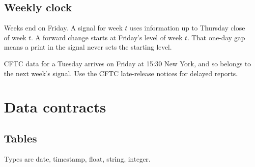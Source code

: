\documentclass[11pt]{article}
\newcommand{\code}[1]{\texttt{\detokenize{#1}}}
\begin{document}
\subsection{Weekly clock}
Weeks end on Friday. A signal for week $t$ uses information up to Thursday close of week $t$. A forward change starts at Friday's level of week $t$. That one-day gap means a print in the signal never sets the starting level.

CFTC data for a Tuesday arrives on Friday at 15:30 New York, and so belongs to the next week's signal. Use the CFTC late-release notices for delayed reports.

\section{Data contracts}\label{sec:data}
\subsection{Tables}
Types are \code{D} date, \code{TS} timestamp, \code{F} float, \code{S} string, \code{I} integer.
\end{document}
